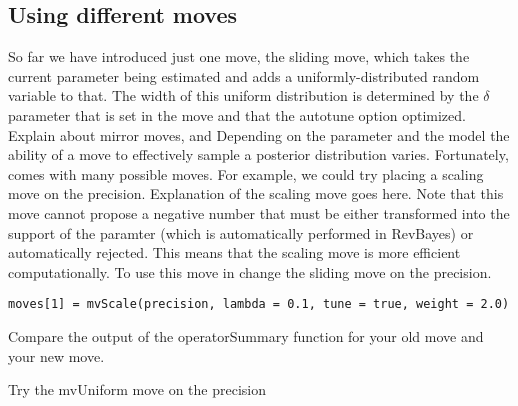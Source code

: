 \subsection{Using different moves}

So far we have introduced just one move, the sliding move, which takes the current parameter being estimated and adds a uniformly-distributed random variable to that. The width of this uniform distribution is determined by the $\delta$ parameter that is set in the move and that the autotune option optimized. Explain about mirror moves, and Depending on the parameter and the model the ability of a move to effectively sample a posterior distribution varies. Fortunately, \RevBayes comes with many possible moves. For example, we could try placing a scaling move on the precision. Explanation of the scaling move goes here. Note that this move cannot propose a negative number that must be either transformed into the support of the paramter (which is automatically performed in RevBayes) or automatically rejected. This means that the scaling move is more efficient computationally. To use this move in \RevBayes change the sliding move on the precision.

{\tt \begin{snugshade*}
 \begin{lstlisting}
moves[1] = mvScale(precision, lambda = 0.1, tune = true, weight = 2.0)
 \end{lstlisting}
\end{snugshade*}}

Compare the output of the operatorSummary function for your old move and your new move. 

Try the mvUniform move on the precision

